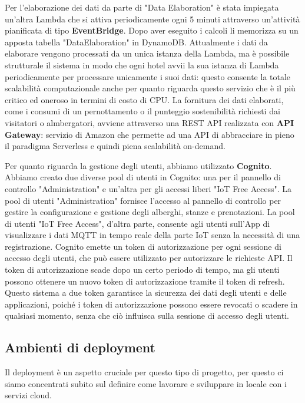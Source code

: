 Per l'elaborazione dei dati da parte di "Data Elaboration" è stata impiegata un'altra Lambda che si attiva periodicamente ogni 5 minuti attraverso un'attività pianificata di tipo \textbf{EventBridge}. Dopo aver eseguito i calcoli li memorizza su un apposta tabella "DataElaboration" in DynamoDB.
Attualmente i dati da elaborare vengono processati da un unica istanza della Lambda, ma è possibile strutturale il sistema in modo che ogni hotel avvii la sua istanza di Lambda periodicamente per processare unicamente i suoi dati: questo consente la totale scalabilità computazionale anche per quanto riguarda questo servizio che è il più critico ed oneroso in termini di costo di CPU.
La fornitura dei dati elaborati, come i consumi di un pernottamento o il punteggio sostenibilità richiesti dai visitatori o almbergatori, avviene attraverso una REST API realizzata con \textbf{API Gateway}: servizio di Amazon che permette ad una API di abbracciare in pieno il paradigma Serverless e quindi piena scalabilità on-demand.

Per quanto riguarda la gestione degli utenti, abbiamo utilizzato \textbf{Cognito}. Abbiamo creato due diverse pool di utenti in Cognito: una per il pannello di controllo "Administration" e un'altra per gli accessi liberi "IoT Free Access". La pool di utenti "Administration" fornisce l'accesso al pannello di controllo per gestire la configurazione e gestione degli alberghi, stanze e prenotazioni. La pool di utenti "IoT Free Access", d'altra parte, consente agli utenti sull'App di visualizzare i dati MQTT in tempo reale della parte IoT senza la necessità di una registrazione.
Cognito emette un token di autorizzazione per ogni sessione di accesso degli utenti, che può essere utilizzato per autorizzare le richieste API. Il token di autorizzazione scade dopo un certo periodo di tempo, ma gli utenti possono ottenere un nuovo token di autorizzazione tramite il token di refresh. Questo sistema a due token garantisce la sicurezza dei dati degli utenti e delle applicazioni, poiché i token di autorizzazione possono essere revocati o scadere in qualsiasi momento, senza che ciò influisca sulla sessione di accesso degli utenti. 

\subsection{Ambienti di deployment}

Il deployment è un aspetto cruciale per questo tipo di progetto, per questo ci siamo concentrati subito sul definire come lavorare e sviluppare in locale con i servizi cloud.

